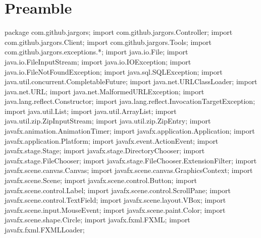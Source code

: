 \section{Preamble}
\nwenddocs{}\endmoddef{}
package com.github.jargors;
import com.github.jargors.Controller;
import com.github.jargors.Client;
import com.github.jargors.Tools;
import com.github.jargors.exceptions.*;
\nwendcode{}\nwdocspar
\nwenddocs{}\plusendmoddef
import java.io.File;
import java.io.FileInputStream;
import java.io.IOException;
import java.io.FileNotFoundException;
import java.sql.SQLException;
import java.util.concurrent.CompletableFuture;
import java.net.URLClassLoader;
import java.net.URL;
import java.net.MalformedURLException;
import java.lang.reflect.Constructor;
import java.lang.reflect.InvocationTargetException;
import java.util.List;
import java.util.ArrayList;
import java.util.zip.ZipInputStream;
import java.util.zip.ZipEntry;
\nwendcode{}\nwdocspar
\nwenddocs{}\plusendmoddef
import javafx.animation.AnimationTimer;
import javafx.application.Application;
import javafx.application.Platform;
import javafx.event.ActionEvent;
import javafx.stage.Stage;
import javafx.stage.DirectoryChooser;
import javafx.stage.FileChooser;
import javafx.stage.FileChooser.ExtensionFilter;
import javafx.scene.canvas.Canvas;
import javafx.scene.canvas.GraphicsContext;
import javafx.scene.Scene;
import javafx.scene.control.Button;
import javafx.scene.control.Label;
import javafx.scene.control.ScrollPane;
import javafx.scene.control.TextField;
import javafx.scene.layout.VBox;
import javafx.scene.input.MouseEvent;
import javafx.scene.paint.Color;
import javafx.scene.shape.Circle;
import javafx.fxml.FXML;
import javafx.fxml.FXMLLoader;
\nwendcode{}\nwdocspar

